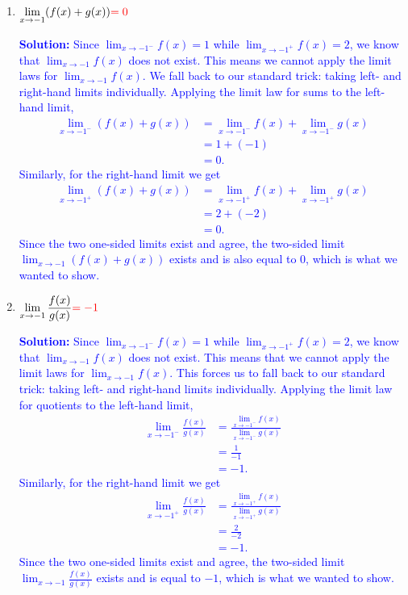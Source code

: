\documentclass[letterpaper,11pt]{article}
\def\ds{\displaystyle}
\newcommand{\tsol}[1]{\textcolor{red}{#1}}
\newcommand{\sol}[1]{\textcolor{blue}{\textbf{Solution:}}\quad \textcolor{blue}{#1}}
\newcommand{\tsol}[1]{\textcolor{white}{#1}}
\newcommand{\sol}[1]{\vfill}
\begin{document}
\begin{enumerate}
\item  $\ds \lim_{x\rightarrow -1} (f(x)+g(x))\tsol{=0}$

\sol{
Since $\ds \lim_{x \to -1^-} f(x) = 1$ while $\ds \lim_{x \to -1^+} f(x) = 2$, we know that $\ds \lim_{x \to -1} f(x)$ does not exist. This means we cannot apply the limit laws for $\ds \lim_{x \to -1} f(x)$.
We fall back to our standard trick: taking left- and right-hand limits individually. Applying the limit law for
sums to the left-hand limit,
\begin{align*}
   \lim_{x \to -1^-} (f(x) + g(x)) &= \lim_{x \to -1^-} f(x) + \lim_{x \to -1^-} g(x) \\
                                                   &= 1 + (-1) \\
                                                   &= 0.
\end{align*}
Similarly, for the right-hand limit we get
\begin{align*}
\lim_{x \to -1^+} (f(x) + g(x)) &= \lim_{x \to -1^+} f(x) + \lim_{x \to -1^+} g(x) \\
                                                   &= 2 + (-2) \\
                                                   &= 0.
\end{align*}
Since the two one-sided limits exist and agree, the two-sided limit $\ds \lim_{x \to -1}(f(x) + g(x))$ exists
and is also equal to $0$, which is what we wanted to show.
}

\item $\ds \lim_{x\rightarrow -1} \frac{f(x)}{g(x)}\tsol{=-1}$

\sol{
Since $\ds \lim_{x \to -1^-} f(x) = 1$ while $\ds \lim_{x \to -1^+} f(x) = 2$, we know that 
$\ds \lim_{x \to -1} f(x)$ does not exist. This means that we cannot apply the limit laws for $\ds \lim_{x \to -1} f(x)$.
This forces us to fall back to our standard trick: taking left- and right-hand limits individually. Applying the limit
law for quotients to the left-hand limit,
\begin{align*}
  \lim_{x \to -1^-} \frac{f(x)}{g(x)} &= \frac{\lim\limits_{x \to -1^-} f(x)}{\lim\limits_{x \to -1^-} g(x)} \\
     &= \frac{1}{-1} \\
     &= -1.
\end{align*}
Similarly, for the right-hand limit we get
\begin{align*}
  \lim_{x \to -1^+} \frac{f(x)}{g(x)} &= \frac{\lim\limits_{x \to -1^+} f(x)}{\lim\limits_{x \to -1^+} g(x)} \\
     &= \frac{2}{-2} \\
     &= -1.
\end{align*}
Since the two one-sided limits exist and agree, the two-sided limit $\ds \lim_{x \to -1}\frac{f(x)}{g(x)}$ exists
and is equal to $-1$, which is what we wanted to show.
}


\end{enumerate}
\end{document}

